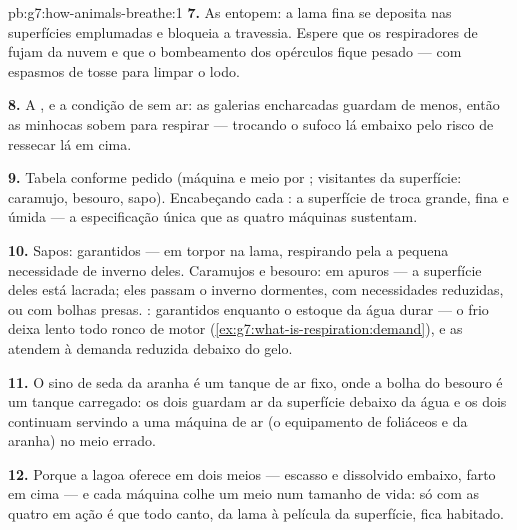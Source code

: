 \begin{solution}{pb:g7:how-animals-breathe:1}
\textbf{7.} As  entopem: a lama fina se deposita nas
superfícies emplumadas e bloqueia a travessia. Espere que os
respiradores de  fujam da nuvem e que o bombeamento dos
opérculos fique pesado --- com espasmos de tosse para limpar o lodo.

\textbf{8.} A , e a condição de  sem ar: as
galerias encharcadas guardam  de menos, então as minhocas
sobem para respirar --- trocando o sufoco lá embaixo pelo risco de
ressecar lá em cima.

\textbf{9.} Tabela conforme pedido (máquina e meio por ;
visitantes da superfície: caramujo, besouro, sapo). Encabeçando cada
: a superfície de troca grande, fina e úmida --- a especificação
única que as quatro máquinas sustentam.

\textbf{10.} Sapos: garantidos --- em torpor na lama, respirando pela
 a pequena necessidade de inverno deles. Caramujos e besouro: em
apuros --- a superfície deles está lacrada; eles passam o inverno
dormentes, com necessidades reduzidas, ou com bolhas presas. :
garantidos enquanto o estoque da água durar --- o frio deixa lento todo
ronco de motor (\cref{ex:g7:what-is-respiration:demand}), e as
 atendem à demanda reduzida debaixo do gelo.

\textbf{11.} O sino de seda da aranha é um tanque de ar fixo, onde a
bolha do besouro é um tanque carregado: os dois guardam ar da
superfície debaixo da água e os dois continuam servindo a uma máquina
de ar (o equipamento de  foliáceos e  da aranha) no
meio errado.

\textbf{12.} Porque a lagoa oferece  em dois meios --- escasso
e dissolvido embaixo, farto em cima --- e cada máquina colhe um meio
num tamanho de vida: só com as quatro em ação é que todo canto, da
lama à película da superfície, fica habitado.
\end{solution}
